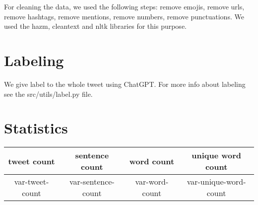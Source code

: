 \documentclass[12pt, letterpaper]{article}
\begin{document}
For cleaning the data, we used the following steps: remove emojis, remove urls, remove hashtags, remove mentions, remove numbers, remove punctuations. We used the hazm, cleantext and nltk libraries for this purpose.

\section{Labeling}
We give label to the whole tweet using ChatGPT. For more info about labeling see the src\slash utils\slash label.py file.

\section{Statistics}
\begin{center}
\begin{tabular}{ |c|c|c|c| } 
    \hline
    tweet count & sentence count & word count & unique word count \\ 
    \hline
    var-tweet-count & var-sentence-count & var-word-count & var-unique-word-count \\
    \hline
\end{tabular}
\end{center}

\begin{center}
\end{center}
\end{document}
